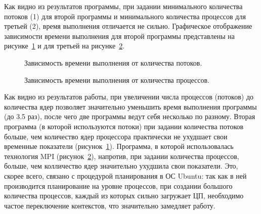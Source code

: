 \documentclass[12pt,a4paper]{report}
\begin{document}
				Как видно из результатов программы, при задании минимального количества 
				потоков (1) для второй программы и минимального количества процессов 
				для третьей (2), время выполнения отличается не сильно. Графическое 
				отображение зависимости времени выполнения для второй программы 
				представлены на рисунке~\ref{ris:threads} и для третьей на 
				рисунке~\ref{ris:mpi}.
				\begin{figure}[h]
					\caption{Зависимость времени выполнения от количества потоков.}
					\label{ris:threads}
				\end{figure}
				
				\begin{figure}[h]
					\caption{Зависимость времени выполнения от количества процессов.}
					\label{ris:mpi}
				\end{figure}
				
				Как видно из результатов работы, при увеличении числа процессов 
				(потоков) до количества ядер позволяет значительно уменьшить время 
				выполнения программы (до 3.5 раз), после чего две программы ведут себя 
				несколько по разному. Вторая программа (в которой используются потоки) 
				при задании количества потоков больше, чем количество ядер процессора 
				практически не ухудшает свои временные показатели 
				(рисунок~\ref{ris:threads}). Программа, в которой использовалась 
				технология MPI (рисунок~\ref{ris:mpi}), напротив, при задании 
				количества процессов, больше, чем колличество ядер значительно ухудшила 
				свои показатели. Это, скорее всего, связано с процедурой планирования в 
				ОС Ubuntu: так как в ней производится планирование на уровне процессов, 
				при создании большого количества процессов, каждый из которых сильно 
				загружает ЦП, необходимо частое переключение контекстов, что 
				значительно замедляет работу.
\end{document}
